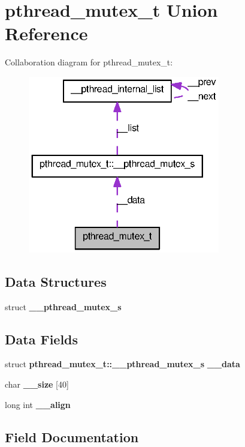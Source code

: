\section{pthread\_\-mutex\_\-t Union Reference}
\label{unionpthread__mutex__t}


Collaboration diagram for pthread\_\-mutex\_\-t:
\nopagebreak
\begin{figure}[H]
\begin{center}
\leavevmode
\includegraphics[width=238pt]{unionpthread__mutex__t__coll__graph}
\end{center}
\end{figure}
\subsection*{Data Structures}
\begin{DoxyCompactItemize}
\item 
struct {\bf \_\-\_\-pthread\_\-mutex\_\-s}
\end{DoxyCompactItemize}
\subsection*{Data Fields}
\begin{DoxyCompactItemize}
\item 
struct {\bf pthread\_\-mutex\_\-t::\_\-\_\-pthread\_\-mutex\_\-s} {\bf \_\-\_\-data}
\item 
char {\bf \_\-\_\-size} [40]
\item 
long int {\bf \_\-\_\-align}
\end{DoxyCompactItemize}


\subsection{Field Documentation}
